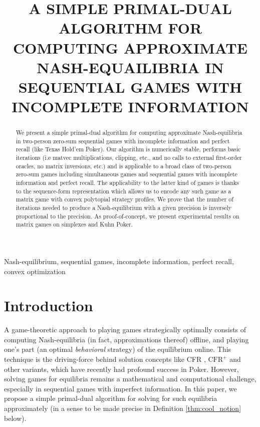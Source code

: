 \documentclass[a4paper,9pt]{extarticle}
\title{A SIMPLE PRIMAL-DUAL ALGORITHM FOR COMPUTING APPROXIMATE
  NASH-EQUAILIBRIA IN SEQUENTIAL GAMES WITH INCOMPLETE INFORMATION}
\begin{document}
\maketitle
\begin{abstract}
We present a simple primal-dual algorithm for computing approximate
Nash-equilibria in two-person zero-sum sequential games with
incomplete information and perfect recall (like Texas Hold'em
Poker). Our algorithm is numerically stable, performs basic
iterations (i.e matvec multiplications, clipping, etc., and no calls
to external first-order oracles, no matrix inversions, etc.) and is
applicable to a broad class of two-person zero-sum games including
simultaneous games and sequential games with incomplete information
and perfect recall. The
applicability to the latter kind of games is thanks to the
sequence-form representation which allows us to encode any such game
as a matrix game with convex polytopial strategy profiles. We prove
that the number of iterations needed to produce a Nash-equilibrium
with a given precision is inversely proportional to the precision. As
proof-of-concept, we present experimental results on matrix games
on simplexes and Kuhn Poker.
\end{abstract}

\begin{keywords} Nash-equilibrium, sequential games,
  incomplete information, perfect recall, convex optimization
\end{keywords}

\section{Introduction}
\label{sec:intro}
A game-theoretic approach to playing games strategically optimally
consists of computing Nash-equilibria (in fact, approximations thereof)
offline, and playing one's part (an optimal \textit{behavioral}
strategy) of the equilibrium online. This
technique is the driving-force behind solution concepts like CFR
\cite{zinkevich2008regret,lanctot2009monte,Bowling09012015},
$\text{CFR}^{+}$ \cite{tammelin14} and other variants, which
have recently had profound success in Poker. However, solving games
for equilibria remains a mathematical and computational challenge,
especially in sequential games with imperfect information. In this
paper, we propose a simple primal-dual algorithm for solving for such
equilibria approximately (in a sense to be made precise in Definition
\ref{thm:cool_notion} below).
\end{document}

